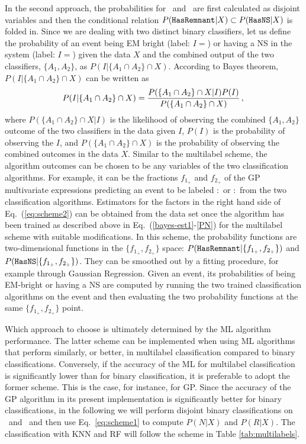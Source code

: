 In the second approach, the probabilities for \hasns\ and \hasrem\ are first calculated as disjoint variables and then the conditional relation $P({{\tt HasRemnant}}|X)\subset P({{\tt HasNS}}|X)$ is
folded in. Since we are dealing with two distinct binary classifiers, let us define the probability of an event being \ac{EM} bright (label: $I=$\hasrem) or having a \ac{NS} in the system (label: $I=$\hasns) given the data $X$ and the combined output of the two classifiers, $\{A_1,A_2\}$, as $P(I|\{A_1\cap A_2\}\cap X)$. According to Bayes theorem, $P(I|\{A_1\cap A_2\}\cap X)$ can be written as
%
\begin{equation}
P(I|\{A_1\cap A_2\} \cap X)=\frac{P(\{A_1\cap A_2\}\cap X|I)P(I)}{P(\{A_1\cap A_2\}\cap X)}\,,\\
\label{eq:scheme2}
\end{equation}
%
where $P(\{A_1\cap A_2\}\cap X|I)$ is the likelihood of observing the combined $\{A_1,A_2\}$ outcome of the two classifiers in the data given $I$, $P(I)$ is the probability of observing the $I$, and $P(\{A_1\cap A_2\}\cap X)$ is the probability of observing the combined outcomes in the data $X$. Similar to the multilabel scheme, the algorithm outcomes can be chosen to be any variables of the two classification algorithms. For example, it can be the fractions $f_{1_+}$ and $f_{2_+}$ of the \ac{GP} multivariate expressions predicting an event to be labeled \hasns:\true\ or \hasrem:\true\ from the two classification algorithms. Estimators for the factors in the right hand side of Eq.~(\ref{eq:scheme2}) can be obtained from the data set once the algorithm has been trained as described above in Eq.~(\ref{bayes-est1}-\ref{PN}) for the multilabel scheme with suitable modifications. In this scheme, the probability functions are two-dimensional functions in the $\{f_{1_+},f_{2_+}\}$ space: $P({{\tt HasRemnant}}|\{f_{1_+},f_{2_+}\})$ and $P({{\tt HasNS}}|\{f_{1_+},f_{2_+}\})$. They can be smoothed out by a fitting procedure, for example through Gaussian Regression. Given an event, its probabilities of being \ac{EM}-bright or having a \ac{NS} are computed by running the two trained classification algorithms on the event and then evaluating the two probability functions at the same $\{f_{1_+},f_{2_+}\}$ point.

Which approach to choose is ultimately determined by the \ac{ML} algorithm performance. The latter scheme can be implemented when using \ac{ML} algorithms that perform similarly, or
better, in multilabel classification compared to binary classifications. Conversely, if the accuracy of the \ac{ML} for multilabel classification is significantly lower than for binary
classification, it is preferable to adopt the former scheme. This is the case, for instance, for \ac{GP}. Since the accuracy of the \ac{GP} algorithm in its present implementation is
significantly better for binary classifications, in the following we will perform disjoint binary classifications on \hasns\ and \hasrem\ and then use Eq.~\ref{eq:scheme1} to compute
$P(N|X)$ and $P(R|X)$. The classification with \ac{KNN} and \ac{RF} will follow the scheme in Table \ref{tab:multilabels}. 
